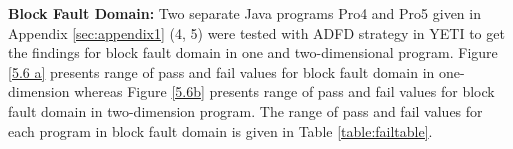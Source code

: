 

\noindent \textbf{Block Fault Domain:}  Two separate Java programs Pro4 and Pro5 given in Appendix \ref{sec:appendix1} (4, 5) were tested with ADFD strategy in YETI to get the findings for block fault domain in one and two-dimensional program. Figure \ref{5.6 a} presents range of pass and fail values for block fault domain in one-dimension whereas Figure \ref{5.6b} presents range of pass and fail values for block fault domain in two-dimension program. The range of pass and fail values for each program in block fault domain is given in Table \ref{table:failtable}.





